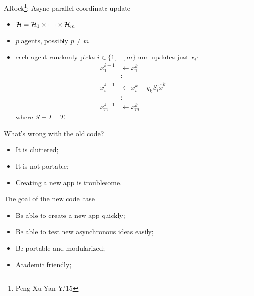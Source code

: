 \documentclass[hyperref,handout,compress,9pt,mathserif]{beamer}
\begin{document}
\begin{frame}{ARock\footnote{Peng-Xu-Yan-Y.'15}: Async-parallel coordinate update}

\begin{itemize}
  \item ${\mathcal{H}} = {\mathcal{H}}_1 \times \cdots \times {\mathcal{H}}_m$
  \item $p$ agents, possibly $p\not=m$
  \item each agent {randomly picks} $i\in\{1,\ldots,m\}$ and updates just $x_i$:
\begin{align*}
x_1^{k+1}&\gets x_1^k\\
&\vdots\\
x_i^{k+1}&\gets x_i^k - \eta_k S_i {\hat{x}^k}\\
&\vdots\\
x_{m}^{k+1}&\gets x_{m}^k
\end{align*}
where $S = I - T$.
\end{itemize}
\end{frame}

\begin{frame}{What's wrong with the old code?}
\begin{itemize}
\item It is cluttered;
\item It is not portable;
\item Creating a new app is troublesome.
\end{itemize}
\end{frame}

\begin{frame}{The goal of the new code base}
\begin{itemize}
\item Be able to create a new app quickly;
\item Be able to test new asynchronous ideas easily;
\item Be portable and modularized;
\item Academic friendly;
\end{itemize}
\end{frame}
\end{document}
